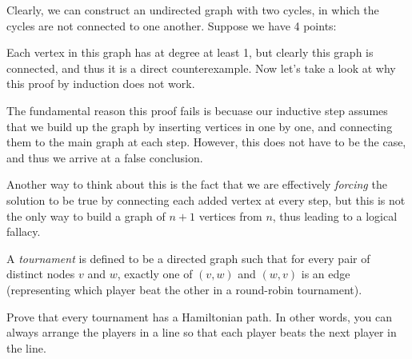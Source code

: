 \documentclass[11pt]{article}
\begin{document}
\begin{solution}
    Clearly, we can construct an undirected graph with two cycles, in which the cycles are not connected to one another. Suppose we have 4 points:
    

    \begin{center}
    \end{center}

    Each vertex in this graph has at degree at least 1, but clearly this graph is connected, and thus it is a direct counterexample. Now let's take a look at why this proof by induction does not work.

    The fundamental reason this proof fails is becuase our inductive step assumes that we build up the graph by inserting vertices in one by one, and connecting them to the main graph at each step. However, this does not have to be the case, and thus we arrive at a false conclusion.

    Another way to think about this is the fact that we are effectively \textit{forcing} the solution to be true by connecting each added vertex at every step, but this is not the only way to build a graph of $n+1$ vertices from $n$, thus leading to a logical fallacy.


  
\end{solution}
\pagebreak
{}  

A \emph{tournament} is defined to be a directed graph such that for every pair
of distinct nodes $v$ and $w$, exactly one of $(v,w)$ and $(w,v)$ is an edge
(representing which player beat the other in a round-robin tournament).

Prove that every tournament has a Hamiltonian path. In other words, you can always
arrange the players in a line so that each player beats the next player in the
line.
\end{document}
